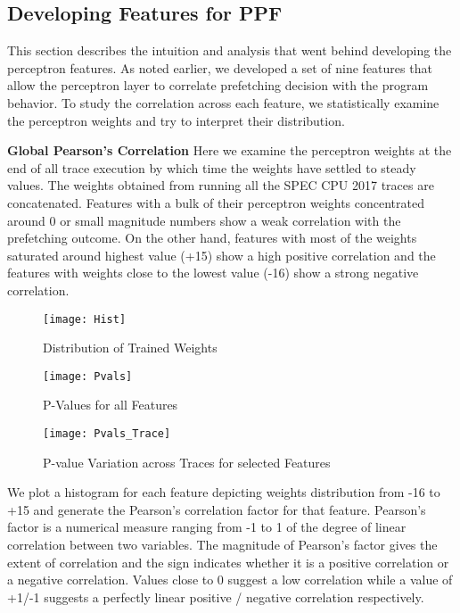 \subsection{Developing Features for PPF}
\label{Method-Features}
This section describes the intuition and analysis that went behind
developing the perceptron features.  As noted earlier, we developed a
set of nine features that allow the perceptron layer to correlate
prefetching decision with the program behavior.  To study the
correlation across each feature, we statistically examine the
perceptron weights and try to interpret their distribution.

\noindent \textbf{Global Pearson's Correlation} Here we examine the
perceptron weights at the end of all trace execution by which time the
weights have settled to steady values. The weights obtained from
running all the SPEC CPU 2017 traces are concatenated.  Features with
a bulk of their perceptron weights concentrated around 0 or small
magnitude numbers show a weak correlation with the prefetching
outcome.  On the other hand, features with most of the weights
saturated around highest value (+15) show a high positive correlation
and the features with weights close to the lowest value (-16) show a
strong negative correlation.

\begin{figure}[h]
  \begin{center}
    \texttt{[image: Hist]}
    \caption{Distribution of Trained Weights}
    \label{Fig:Hist}
  \end{center}
\end{figure}

\begin{figure}[h]
  \begin{center}
    \texttt{[image: Pvals]}
    \caption{P-Values for all Features}
    \label{Fig:Pvals}
  \end{center}
\end{figure}


\begin{figure}[h]
  \begin{center}
    \texttt{[image: Pvals\_Trace]}
    \caption{P-value Variation across Traces for selected Features}
    \label{Fig:Pvals_Trace}
  \end{center}
\end{figure}

We plot a histogram for each feature depicting weights distribution
from -16 to +15 and generate the Pearson's correlation factor for that
feature.  Pearson's factor is a numerical measure ranging from -1 to 1
of the degree of linear correlation between two variables. The
magnitude of Pearson's factor gives the extent of correlation and the
sign indicates whether it is a positive correlation or a negative
correlation. Values close to 0 suggest a low correlation while a value
of +1/-1 suggests a perfectly linear positive / negative correlation
respectively.

